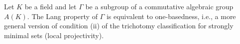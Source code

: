 Let $K$ be a field and let $\Gamma$ be a subgroup of a commutative algebraic group $A(K)$. The Lang property of $\Gamma$ is equivalent to one-basedness, i.e., a more general version of condition (ii) of the trichotomy classification for strongly minimal sets (local projectivity).
